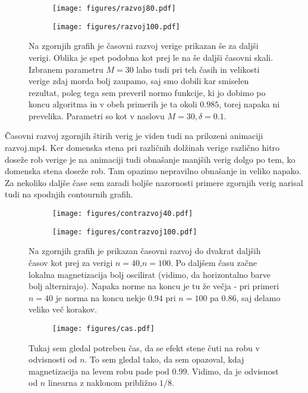 \documentclass{article}
\begin{document}
\begin{figure}[H]
\centering
\begin{subfigure}{.49\textwidth}
\texttt{[image: figures/razvoj80.pdf]}
\end{subfigure}
\begin{subfigure}{.49\textwidth}
\texttt{[image: figures/razvoj100.pdf]}
\end{subfigure}
\caption*{Na zgornjih grafih je časovni razvoj verige prikazan še za daljši verigi. Oblika je spet podobna kot prej le na še daljši časovni skali. Izbranem parametru $M=30$ laho tudi pri teh časih in velikosti verige zdaj morda bolj zaupamo, saj smo dobili kar smiselen rezultat, poleg tega sem preveril normo funkcije, ki jo dobimo po koncu algoritma in v obeh primerih je ta okoli $0.985$, torej napaka ni prevelika. Parametri so kot v naslovu $M=30, \delta=0.1$. }
\end{figure}

Časovni razvoj zgornjih štirih verig je viden tudi na prilozeni animaciji razvoj.mp4. Ker domenska stena pri različnih dolžinah verige različno hitro doseže rob verige je na animaciji tudi obnašanje manjših verig dolgo po tem, ko domenska stena doseže rob. Tam opazimo nepravilno obnašanje in veliko napako.
Za nekoliko daljše čase sem zaradi boljše nazornosti primere zgornjih verig narisal tudi na spodnjih contournih grafih.

\begin{figure}[H]
\centering
\begin{subfigure}{.49\textwidth}
\texttt{[image: figures/contrazvoj40.pdf]}
\end{subfigure}
\begin{subfigure}{.49\textwidth}
\texttt{[image: figures/contrazvoj100.pdf]}
\end{subfigure}
\caption*{Na zgornjih grafih je prikazan časovni razvoj do dvakrat daljših časov kot prej za verigi $n=40$,$n=100$.  Po daljšem času začne lokalna magnetizacija bolj oscilirat (vidimo, da horizontalno barve bolj alternirajo). Napaka norme na koncu je tu že večja - pri primeri $n=40$ je norma na koncu nekje $0.94$ pri $n=100$ pa $0.86$, saj delamo veliko več korakov. }
\end{figure}

\begin{figure}[H]
\centering
\begin{subfigure}{.7\textwidth}
\texttt{[image: figures/cas.pdf]}
\end{subfigure}
\caption*{Tukaj sem gledal potreben čas, da se efekt stene čuti na robu v odvisnosti od $n$. To sem gledal tako, da sem opazoval, kdaj magnetizacija na levem robu pade pod $0.99$. Vidimo, da je odvisnost od $n$ linearna z naklonom približno $1/8$.}
\end{figure}
\end{document}
